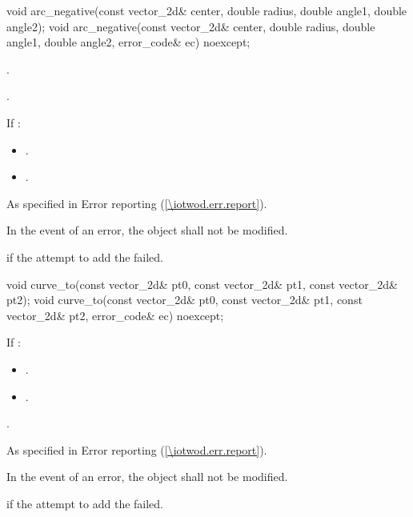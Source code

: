 \begin{itemdecl}
    void arc_negative(const vector_2d& center, double radius, double angle1,
      double angle2);
    void arc_negative(const vector_2d& center, double radius, double angle1,
      double angle2, error_code& ec) noexcept;
\end{itemdecl}
\begin{itemdescr}
	\pnum
	\effects
	.
	
	\pnum
	.
	
	\pnum
	If :
	\begin{itemize}
	\item {}.
	
	\item {}.
	\end{itemize}
	
	\pnum
	\throws
	As specified in Error reporting (\ref{\iotwod.err.report}).

	\pnum
	\remarks
	In the event of an error, the object shall not be modified.

	\pnum
	\errors
	 if the attempt to add the  failed.
	
\end{itemdescr}

\begin{itemdecl}
    void curve_to(const vector_2d& pt0, const vector_2d& pt1,
      const vector_2d& pt2);
    void curve_to(const vector_2d& pt0, const vector_2d& pt1,
      const vector_2d& pt2, error_code& ec) noexcept;
\end{itemdecl}
\begin{itemdescr}
	\pnum
	\effects
	If :
	\begin{itemize}
	\item {}.
	
	\item {}.
	\end{itemize}
	
	\pnum
	.
	
	\pnum
	\throws
	As specified in Error reporting (\ref{\iotwod.err.report}).

	\pnum
	\remarks
	In the event of an error, the object shall not be modified.

	\pnum
	\errors
	 if the attempt to add the  failed.
	
\end{itemdescr}

